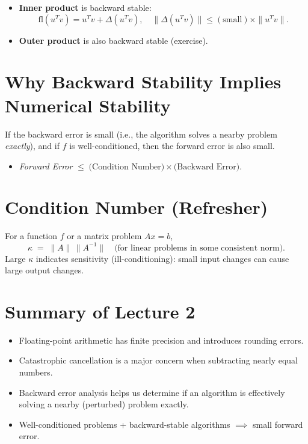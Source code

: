 \begin{itemize}
    \item \textbf{Inner product} is backward stable: 
    \[
      \mathrm{fl}(u^T v) = u^T v + \Delta (u^T v),
      \quad
      \|\Delta (u^T v)\| \le \mathrm{(small)} \times \|u^T v\|.
    \]
    \item \textbf{Outer product} is also backward stable (exercise).
\end{itemize}

\section*{Why Backward Stability Implies Numerical Stability}

If the backward error is small (i.e., the algorithm solves a nearby problem \emph{exactly}), and if $f$ is well-conditioned, then the forward error is also small. 

\begin{itemize}
    \item \emph{Forward Error} $\le \; \text{(Condition Number)} \times \text{(Backward Error)}.$
\end{itemize}

\section*{Condition Number (Refresher)}

For a function $f$ or a matrix problem $A x = b$,
\[
\kappa \;=\; \|A\| \,\|A^{-1}\|\quad
\text{(for linear problems in some consistent norm).}
\]
Large $\kappa$ indicates sensitivity (ill-conditioning): small input changes can cause large output changes.

\section*{Summary of Lecture 2}

\begin{itemize}
    \item Floating-point arithmetic has finite precision and introduces rounding errors.
    \item Catastrophic cancellation is a major concern when subtracting nearly equal numbers.
    \item Backward error analysis helps us determine if an algorithm is effectively solving a nearby (perturbed) problem exactly.
    \item Well-conditioned problems + backward-stable algorithms $\implies$ small forward error.
\end{itemize}

